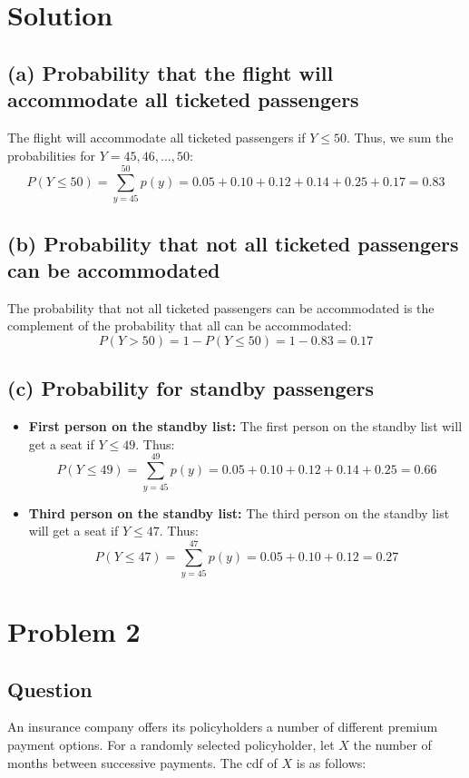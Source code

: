 \documentclass{article}
\begin{document}
\section*{Solution}

\subsection*{(a) Probability that the flight will accommodate all ticketed passengers}
The flight will accommodate all ticketed passengers if $Y \leq 50$. Thus, we sum the probabilities for $Y = 45, 46, \ldots, 50$:
\[
P(Y \leq 50) = \sum_{y=45}^{50} p(y) = 0.05 + 0.10 + 0.12 + 0.14 + 0.25 + 0.17 = 0.83
\]

\subsection*{(b) Probability that not all ticketed passengers can be accommodated}
The probability that not all ticketed passengers can be accommodated is the complement of the probability that all can be accommodated:
\[
P(Y > 50) = 1 - P(Y \leq 50) = 1 - 0.83 = 0.17
\]

\subsection*{(c) Probability for standby passengers}
\begin{itemize}
    \item \textbf{First person on the standby list:}
    The first person on the standby list will get a seat if $Y \leq 49$. Thus:
    \[
    P(Y \leq 49) = \sum_{y=45}^{49} p(y) = 0.05 + 0.10 + 0.12 + 0.14 + 0.25  = 0.66
    \]
    \item \textbf{Third person on the standby list:}
    The third person on the standby list will get a seat if $Y \leq 47$. Thus:
    \[
    P(Y \leq 47) = \sum_{y=45}^{47} p(y) = 0.05 + 0.10 + 0.12 = 0.27
    \]
\end{itemize}

\section*{Problem 2}
\subsection*{Question}
An insurance company offers its policyholders a number of different premium payment options. For a randomly selected policyholder, let \(X\) the number of months between successive payments. The cdf of \(X\) is as follows:
\end{document}
